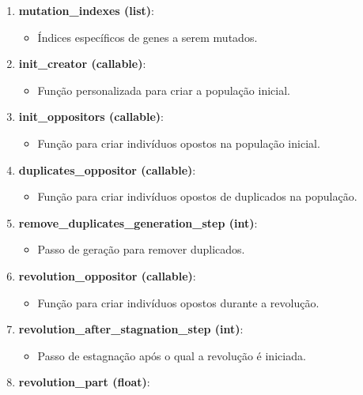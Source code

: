 \documentclass[a4paper, 12pt]{article}
\begin{document}
\begin{enumerate}
\begin{itemize}
        \item Se definido como True, o algoritmo usará a estratégia StudGA, que preserva os melhores indivíduos em cada geração.
    \end{itemize}
    \item \textbf{mutation\_indexes (list)}:
    \begin{itemize}
        \item Índices específicos de genes a serem mutados.
    \end{itemize}
    \item \textbf{init\_creator (callable)}:
    \begin{itemize}
        \item Função personalizada para criar a população inicial.
    \end{itemize}
    \item \textbf{init\_oppositors (callable)}:
    \begin{itemize}
        \item Função para criar indivíduos opostos na população inicial.
    \end{itemize}
    \item \textbf{duplicates\_oppositor (callable)}:
    \begin{itemize}
        \item Função para criar indivíduos opostos de duplicados na população.
    \end{itemize}
    \item \textbf{remove\_duplicates\_generation\_step (int)}:
    \begin{itemize}
        \item Passo de geração para remover duplicados.
    \end{itemize}
    \item \textbf{revolution\_oppositor (callable)}:
    \begin{itemize}
        \item Função para criar indivíduos opostos durante a revolução.
    \end{itemize}
    \item \textbf{revolution\_after\_stagnation\_step (int)}:
    \begin{itemize}
        \item Passo de estagnação após o qual a revolução é iniciada.
    \end{itemize}
    \item \textbf{revolution\_part (float)}:
    \begin{itemize}

\end{itemize}
\end{enumerate}
\end{document}
